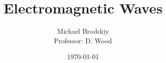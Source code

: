 


\title{Electromagnetic Waves}
\date{\today}
\author{Michael Brodskiy\\ \small Professor: D. Wood}



\maketitle

